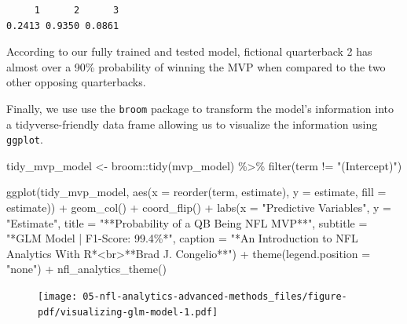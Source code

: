 \documentclass[
  letterpaper,
]{krantz}
\newenvironment{Shaded}{\begin{snugshade}}{\end{snugshade}}
\newcommand{\AttributeTok}[1]{\textcolor[rgb]{0.40,0.45,0.13}{#1}}
\newcommand{\FunctionTok}[1]{\textcolor[rgb]{0.28,0.35,0.67}{#1}}
\newcommand{\NormalTok}[1]{\textcolor[rgb]{0.00,0.23,0.31}{#1}}
\newcommand{\OtherTok}[1]{\textcolor[rgb]{0.00,0.23,0.31}{#1}}
\newcommand{\SpecialCharTok}[1]{\textcolor[rgb]{0.37,0.37,0.37}{#1}}
\newcommand{\StringTok}[1]{\textcolor[rgb]{0.13,0.47,0.30}{#1}}
\begin{document}
\begin{verbatim}
     1      2      3 
0.2413 0.9350 0.0861 
\end{verbatim}

According to our fully trained and tested model, fictional quarterback 2
has almost over a 90\% probability of winning the MVP when compared to
the two other opposing quarterbacks.

Finally, we use use the \texttt{broom} package to transform the model's
information into a tidyverse-friendly data frame allowing us to
visualize the information using \texttt{ggplot}.

\begin{Shaded}
\begin{Highlighting}[]
\NormalTok{tidy\_mvp\_model }\OtherTok{\textless{}{-}}\NormalTok{ broom}\SpecialCharTok{::}\FunctionTok{tidy}\NormalTok{(mvp\_model) }\SpecialCharTok{\%\textgreater{}\%}
  \FunctionTok{filter}\NormalTok{(term }\SpecialCharTok{!=} \StringTok{"(Intercept)"}\NormalTok{)}

\FunctionTok{ggplot}\NormalTok{(tidy\_mvp\_model, }\FunctionTok{aes}\NormalTok{(}\AttributeTok{x =} \FunctionTok{reorder}\NormalTok{(term, estimate),}
                           \AttributeTok{y =}\NormalTok{ estimate, }\AttributeTok{fill =}\NormalTok{ estimate)) }\SpecialCharTok{+}
  \FunctionTok{geom\_col}\NormalTok{() }\SpecialCharTok{+}
  \FunctionTok{coord\_flip}\NormalTok{() }\SpecialCharTok{+}
  \FunctionTok{labs}\NormalTok{(}\AttributeTok{x =} \StringTok{"Predictive Variables"}\NormalTok{,}
       \AttributeTok{y =} \StringTok{"Estimate"}\NormalTok{,}
       \AttributeTok{title =} \StringTok{"**Probability of a QB Being NFL MVP**"}\NormalTok{,}
       \AttributeTok{subtitle =} \StringTok{"*GLM Model | F1{-}Score: 99.4\%*"}\NormalTok{,}
       \AttributeTok{caption =} \StringTok{"*An Introduction to NFL Analytics With R*\textless{}br\textgreater{}**Brad J. Congelio**"}\NormalTok{) }\SpecialCharTok{+}
  \FunctionTok{theme}\NormalTok{(}\AttributeTok{legend.position =} \StringTok{"none"}\NormalTok{) }\SpecialCharTok{+}
  \FunctionTok{nfl\_analytics\_theme}\NormalTok{()}
\end{Highlighting}
\end{Shaded}

\begin{figure}[H]

{\centering \texttt{[image: 05-nfl-analytics-advanced-methods\_files/figure-pdf/visualizing-glm-model-1.pdf]}

}

\end{figure}
\end{document}
